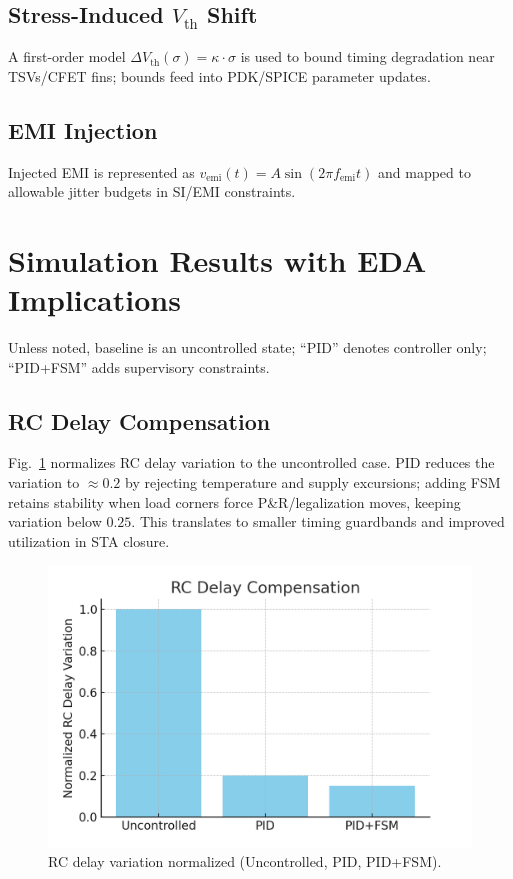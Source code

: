 \documentclass[conference]{IEEEtran}
\begin{document}
\subsection{Stress-Induced $V_{\mathrm{th}}$ Shift}
A first-order model $\Delta V_{\mathrm{th}}(\sigma)=\kappa\cdot\sigma$ is used to bound timing degradation near TSVs/CFET fins; bounds feed into PDK/SPICE parameter updates.

\subsection{EMI Injection}
Injected EMI is represented as $v_{\mathrm{emi}}(t)=A\sin (2\pi f_{\mathrm{emi}} t)$ and mapped to allowable jitter budgets in SI/EMI constraints.

\section{Simulation Results with EDA Implications}
Unless noted, baseline is an uncontrolled state; ``PID'' denotes controller only; ``PID+FSM'' adds supervisory constraints.

\subsection{RC Delay Compensation}
Fig.~\ref{fig:rc} normalizes RC delay variation to the uncontrolled case. PID reduces the variation to $\approx 0.2$ by rejecting temperature and supply excursions; adding FSM retains stability when load corners force P\&R/legalization moves, keeping variation below $0.25$. This translates to smaller timing guardbands and improved utilization in STA closure.

\begin{figure}[t]
\centering
\includegraphics[width=0.95\linewidth]{figs/sim_delay_rc.png}
\caption{RC delay variation normalized (Uncontrolled, PID, PID+FSM).}
\label{fig:rc}
\end{figure}
\end{document}
